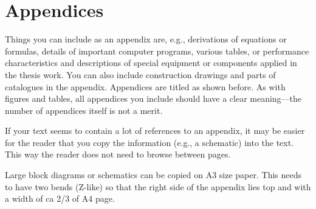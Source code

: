 \section{Appendices}
\label{sec:appendices}

Things you can include as an appendix are, e.g., derivations of equations or formulas, details of important computer programs, various tables, or performance characteristics and descriptions of special equipment or components applied in the thesis work. You can also include construction drawings and parts of catalogues in the appendix. Appendices are titled as shown before. As with figures and tables, all appendices you include should have a clear meaning---the number of appendices itself is not a merit.

If your text seems to contain a lot of references to an appendix, it may be easier for the reader that you copy the information (e.g., a schematic) into the text. This way the reader does not need to browse between pages.

Large block diagrams or schematics can be copied on A3 size paper. This needs to have two bends (Z-like) so that the right side of the appendix lies top and with a width of ca 2/3 of A4 page.